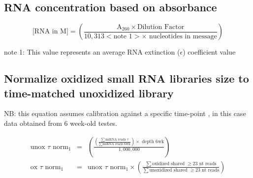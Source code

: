 

\subsection{RNA concentration based on absorbance}

  $$
  \mbox{[RNA in M]} = \left( \frac{\mbox{A}_{260} \times \mbox{Dilution Factor}}
                             {10,313 < \mbox{note 1}> \times \mbox{ nucleotides in message}} \right) 
  $$
  
  note 1: This value represents an average RNA extinction ($\epsilon$) coefficient value \\

\subsection{Normalize oxidized small RNA libraries size to time-matched unoxidized library}

NB: this equation assumes calibration against a specific time-point ,
in this case data obtained from 6 week-old testes.

  \begin{eqnarray*}
    \mbox{unox }\tau \mbox{ norm}_1 & = & \left(         
                          \frac{\left( \frac{\displaystyle\sum \mbox{miRNA reads } \tau}{\displaystyle \sum \mbox{miRNA reads 6wk} } \right) \times \mbox{ depth 6wk} }{1,000,000}              
                                            \right)\\
    \mbox{ox }\tau \mbox{ norm}_1 & = &   \mbox{unox }\tau \mbox{ norm}_1 \times
                                   \left(
                                    \frac{\displaystyle \sum \mbox{oxidized shared } \ge \mbox{23 nt reads}}{\displaystyle \sum \mbox{unoxidized shared } \ge \mbox{23 nt reads}}
                                   \right)                                         
    \end{eqnarray*}

